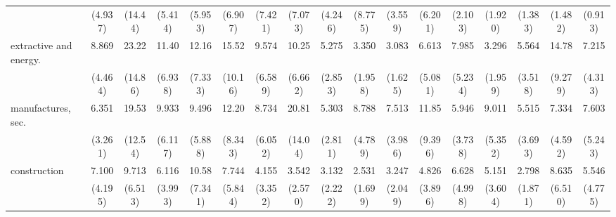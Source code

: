 {\begin{tabular}{l*{16}{c}}
                    &     (4.937)         &     (14.44)         &     (5.414)         &     (5.953)         &     (6.907)         &     (7.421)         &     (7.073)         &     (4.246)         &     (8.775)         &     (3.559)         &     (6.201)         &     (2.103)         &     (1.920)         &     (1.383)         &     (1.482)         &     (0.913)         \\
[1em]
extractive and energy.&       8.869\sym{***}&       23.22\sym{***}&       11.40\sym{***}&       12.16\sym{***}&       15.52\sym{***}&       9.574\sym{**} &       10.25\sym{***}&       5.275\sym{**} &       3.350\sym{*}  &       3.083\sym{*}  &       6.613\sym{*}  &       7.985\sym{**} &       3.296\sym{*}  &       5.564\sym{**} &       14.78\sym{***}&       7.215\sym{***}\\
                    &     (4.464)         &     (14.86)         &     (6.938)         &     (7.333)         &     (10.16)         &     (6.589)         &     (6.662)         &     (2.853)         &     (1.958)         &     (1.625)         &     (5.081)         &     (5.234)         &     (1.959)         &     (3.518)         &     (9.279)         &     (4.313)         \\
[1em]
manufactures, sec.  &       6.351\sym{***}&       19.53\sym{***}&       9.933\sym{***}&       9.496\sym{***}&       12.20\sym{***}&       8.734\sym{**} &       20.81\sym{***}&       5.303\sym{**} &       8.788\sym{***}&       7.513\sym{***}&       11.85\sym{**} &       5.946\sym{**} &       9.011\sym{***}&       5.515\sym{*}  &       7.334\sym{**} &       7.603\sym{**} \\
                    &     (3.261)         &     (12.54)         &     (6.117)         &     (5.888)         &     (8.343)         &     (6.052)         &     (14.04)         &     (2.811)         &     (4.789)         &     (3.986)         &     (9.396)         &     (3.738)         &     (5.352)         &     (3.693)         &     (4.592)         &     (5.243)         \\
[1em]
construction        &       7.100\sym{***}&       9.713\sym{***}&       6.116\sym{**} &       10.58\sym{***}&       7.744\sym{**} &       4.155         &       3.542         &       3.132         &       2.531         &       3.247         &       4.826         &       6.628\sym{*}  &       5.151\sym{*}  &       2.798         &       8.635\sym{**} &       5.546\sym{*}  \\
                    &     (4.195)         &     (6.513)         &     (3.993)         &     (7.341)         &     (5.844)         &     (3.352)         &     (2.570)         &     (2.222)         &     (1.699)         &     (2.049)         &     (3.896)         &     (4.998)         &     (3.604)         &     (1.871)         &     (6.510)         &     (4.775)         \\

\end{tabular}}

